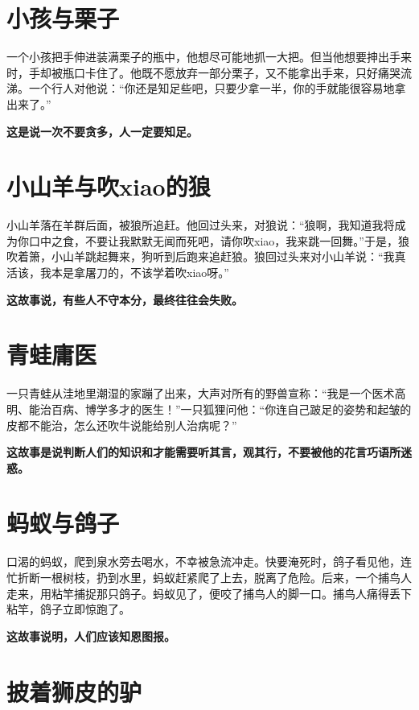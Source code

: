 \section{小孩与栗子}

一个小孩把手伸进装满栗子的瓶中，他想尽可能地抓一大把。但当他想要抻出手来时，手却被瓶口卡住了。他既不愿放弃一部分栗子，又不能拿出手来，只好痛哭流涕。一个行人对他说：“你还是知足些吧，只要少拿一半，你的手就能很容易地拿出来了。”

{\bfseries \color{red}这是说一次不要贪多，人一定要知足。}

\section{小山羊与吹xiao的狼}

小山羊落在羊群后面，被狼所追赶。他回过头来，对狼说：“狼啊，我知道我将成为你口中之食，不要让我默默无闻而死吧，请你吹xiao，我来跳一回舞。”于是，狼吹着箫，小山羊跳起舞来，狗听到后跑来追赶狼。狼回过头来对小山羊说：“我真活该，我本是拿屠刀的，不该学着吹xiao呀。”

{\bfseries \color{red}这故事说，有些人不守本分，最终往往会失败。}

\section{青蛙庸医}

一只青蛙从洼地里潮湿的家蹦了出来，大声对所有的野兽宣称：“我是一个医术高明、能治百病、博学多才的医生！”一只狐狸问他：“你连自己跛足的姿势和起皱的皮都不能治，怎么还吹牛说能给别人治病呢？”

{\bfseries \color{red}这故事是说判断人们的知识和才能需要听其言，观其行，不要被他的花言巧语所迷惑。}

\section{蚂蚁与鸽子}

口渴的蚂蚁，爬到泉水旁去喝水，不幸被急流冲走。快要淹死时，鸽子看见他，连忙折断一根树枝，扔到水里，蚂蚁赶紧爬了上去，脱离了危险。后来，一个捕鸟人走来，用粘竿捕捉那只鸽子。蚂蚁见了，便咬了捕鸟人的脚一口。捕鸟人痛得丢下粘竿，鸽子立即惊跑了。

{\bfseries \color{red}这故事说明，人们应该知恩图报。}

\section{披着狮皮的驴}

